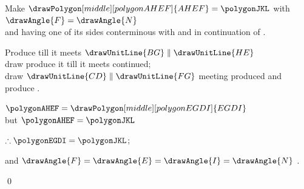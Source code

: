 \documentclass[booklanguage=english]{byrnebook}
\begin{document}
\begin{center}
Make $\drawPolygon[middle][polygonAHEF]{AHEF} = \polygonJKL$ with $\drawAngle{F} = \drawAngle{N}$ \\
and having one of its sides  conterminous with and in continuation of .

Produce  till it meets $\drawUnitLine{BG} \parallel \drawUnitLine{HE}$\\
draw  produce it till it meets  continued;\\
draw $\drawUnitLine{CD} \parallel \drawUnitLine{FG}$ meeting  produced and produce .

$\polygonAHEF = \drawPolygon[middle][polygonEGDI]{EGDI}$ \\
but $\polygonAHEF = \polygonJKL$ \byref{\constref}

$\therefore \polygonEGDI = \polygonJKL$;

and $\drawAngle{F} = \drawAngle{E} =\drawAngle{I} = \drawAngle{N}$ . %
\end{center}

\qed
\end{document}
